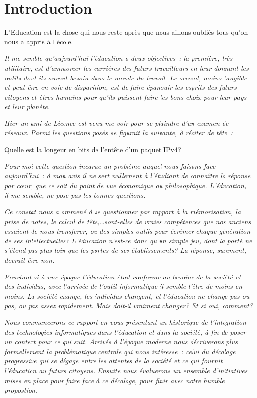 
\chapter*{Introduction}\label{intro}

\begin{coolquote}
\Large L'Education est la chose qui nous reste après que nous aillons oubliés tous qu'on nous a appris à l'école.
\end{coolquote}

\textit{Il me semble qu'aujourd'hui l'éducation a deux objectives~: la première, très utilitaire, est d'ammorcer les carrières des futurs travailleurs en leur donnant les outils dont ils auront besoin dans le monde du travail. Le second, moins tangible et peut-être en voie de disparition, est de faire épanouir les esprits des futurs citoyens et êtres humains pour qu'ils puissent faire les bons choix pour leur pays et leur planète.}

\textit{Hier un ami de Licence est venu me voir pour se plaindre d'un examen de réseaux. Parmi les questions posés se figurait la suivante, à réciter de tête~:}

\begin{coolquote}\Large Quelle est la longeur en bits de l'entête d'un paquet IPv4?\end{coolquote}

\textit{Pour moi cette question incarne un problème auquel nous faisons face aujourd'hui~: à mon avis il ne sert nullement à l'étudiant de connaître la réponse par c\oe{}ur, que ce soit du point de vue économique ou philosophique. L'éducation, il me semble, ne pose pas les bonnes questions.}

\textit{Ce constat nous a ammené à se questionner par rapport à la mémorisation, la prise de notes, le calcul de tête,\ldots sont-elles de vraies compétences que nos anciens essaient de nous transferer, ou des simples outils pour écrèmer chaque génération de ses intellectuelles? L'éducation n'est-ce donc qu'un simple jeu, dont la porté ne s'étend pas plus loin que les portes de ses établissements? La réponse, surement, devrait être non.}

\textit{Pourtant si à une époque l'éducation était conforme au besoins de la société et des individus, avec l'arrivée de l'outil informatique il semble l'être de moins en moins. La société change, les individus changent, et l'éducation ne change pas ou pas, ou pas assez rapidement. Mais doit-il vraiment changer? Et si oui, comment?}

\textit{Nous commencerons ce rapport en vous présentant un historique de l'intégration des technologies informatiques dans l'éducation et dans la société, à fin de poser un context pour ce qui suit. Arrivés à l'époque moderne nous décriverons plus formellement la problématique centrale qui nous intéresse~: celui du décalage progressive qui se dégage entre les attentes de la société et ce qui fournit l'éducation au futurs citoyens. Ensuite nous évaluerons un ensemble d'initiatives mises en place pour faire face à ce décalage, pour finir avec notre humble propostion.}